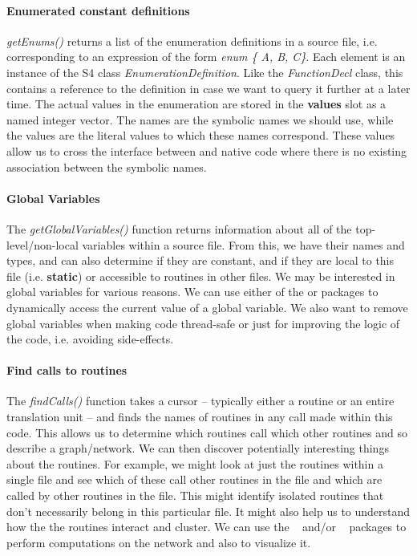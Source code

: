 \documentclass[article]{jss}
\def\R{\proglang{R}}
\def\Rpkg#1{\pkg{#1}}
\def\Rfunc#1{\textsl{#1()}}
\def\Rclass#1{\textit{#1}}
\def\Rslot#1{\textbf{#1}}
\def\Ckeyword#1{\textbf{#1}}
\def\Cexpr#1{\textsl{#1}}
\begin{document}
\paragraph{Enumerated constant definitions}
\Rfunc{getEnums} returns a list of the enumeration definitions in a
source file, i.e. corresponding to an expression of the form
\Cexpr{enum \{ A, B, C\}}. Each element is an instance of the S4 class
\Rclass{EnumerationDefinition}.  Like the \Rclass{FunctionDecl} class,
this contains a reference to the definition in case we want to query
it further at a later time.  The actual values in the enumeration are
stored in the \Rslot{values} slot as a named integer vector.  The
names are the symbolic names we should use, while the values are the
literal values to which these names correspond.  These values allow us
to cross the interface between \R{} and native code where there is no
existing association between the symbolic names.

\paragraph{Global Variables}
The \Rfunc{getGlobalVariables} function returns information about all
of the top-level/non-local variables within a source file.  From this, we have
their names and types, and can also determine if they are constant,
and if they are local to this file (i.e. \Ckeyword{static}) or
accessible to routines in other files.  We may be interested in global
variables for various reasons.  We can use either of the
\Rpkg{rdyncall} or \Rpkg{Rffi} packages to dynamically access the
current value of a global variable.  We also want to remove global
variables when making code thread-safe or just for improving the logic
of the code, i.e. avoiding side-effects.


\paragraph{Find calls to routines}
The \Rfunc{findCalls} function takes a cursor -- typically either a
routine or an entire translation unit -- and finds the names of
routines in any call made within this code.  This allows us to
determine which routines call which other routines and so describe a
graph/network.  We can then discover potentially interesting things
about the routines.  For example, we might look at just the routines
within a single file and see which of these call other routines in the
file and which are called by other routines in the file.  This might
identify isolated routines that don't necessarily belong in this
particular file. It might also help us to understand how the the
routines interact and cluster.  We can use the \Rpkg{igraph}~\cite{bib:igraph} and/or
\Rpkg{graph}~\cite{bib:graphPkg} packages to perform computations on the network and also
to visualize it.
\end{document}
